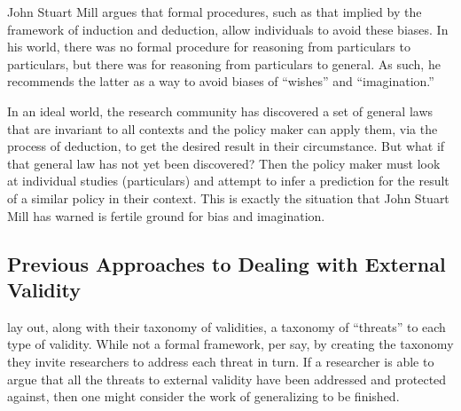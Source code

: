 \documentclass[a4paper,12pt]{article}
\begin{document}
John Stuart Mill argues that formal procedures, such as that implied by the framework of induction and deduction, allow individuals to avoid these biases. In his world, there was no formal procedure for reasoning from particulars to particulars, but there was for reasoning from particulars to general. As such, he recommends the latter as a way to avoid biases of ``wishes'' and ``imagination.''

In an ideal world, the research community has discovered a set of general laws that are invariant to all contexts and the policy maker can apply them, via the process of deduction, to get the desired result in their circumstance. But what if that general law has not yet been discovered? Then the policy maker must look at individual studies (particulars) and attempt to infer a prediction for the result of a similar policy in their context. This is exactly the situation that John Stuart Mill has warned is fertile ground for bias and imagination. 



\subsection*{Previous Approaches to Dealing with External Validity}

\cite{Shadish2002} lay out, along with their taxonomy of validities, a taxonomy of ``threats'' to each type of validity. While not a formal framework, per say, by creating the taxonomy they invite researchers to address each threat in turn. If a researcher is able to argue that all the threats to external validity have been addressed and protected against, then one might consider the work of generalizing to be finished. 
\end{document}
